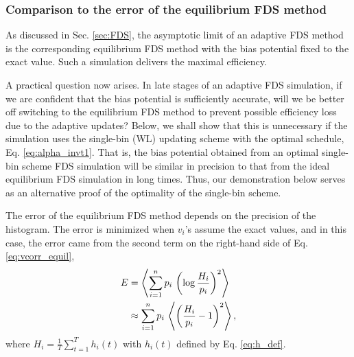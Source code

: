 \documentclass[reprint, floatfix]{revtex4-1}
\begin{document}
\subsubsection{\label{sec:equilerr}
Comparison to the error of the equilibrium FDS method}


As discussed in Sec. \ref{sec:FDS},
the asymptotic limit of an adaptive FDS method
is the corresponding equilibrium FDS method
with the bias potential fixed to the exact value.
%
Such a simulation delivers the maximal efficiency.

A practical question now arises.
%
In late stages of an adaptive FDS simulation,
if we are confident that the bias potential
is sufficiently accurate,
will we be better off switching to the equilibrium FDS method
to prevent possible efficiency loss
due to the adaptive updates?
%
Below, we shall show that this is unnecessary
if the simulation uses the single-bin (WL) updating scheme
with the optimal schedule, Eq. \eqref{eq:alpha_invt1}.
%
That is, the bias potential obtained from
an optimal single-bin scheme FDS simulation
will be similar in precision to that from
the ideal equilibrium FDS simulation
in long times.
%
Thus, our demonstration below serves as an alternative proof
of the optimality of the single-bin scheme.

The error of the equilibrium FDS method
depends on the precision of the histogram.
%
The error is minimized
when $v_i$'s assume the exact values,
%
and in this case,
the error came from the second term
on the right-hand side of Eq. \eqref{eq:vcorr_equil},
%
\begin{align}
  E
  &=
  \left\langle
    \sum_{ i = 1 }^ n
      p_i \,
      \left(
        \log \frac { H_i }
                   { p_i }
      \right)^2
  \right\rangle
\notag
\\
  &\approx
  \sum_{ i = 1 }^ n
    p_i \,
    \left\langle
      \left(
        \frac { H_i }
              { p_i }
        - 1
      \right)^2
    \right\rangle,
\notag
\end{align}
where
$H_i = \frac{1}{T} \sum_{t = 1}^T h_i(t)$
with
$h_i(t)$ defined by Eq. \eqref{eq:h_def}.
\end{document}
